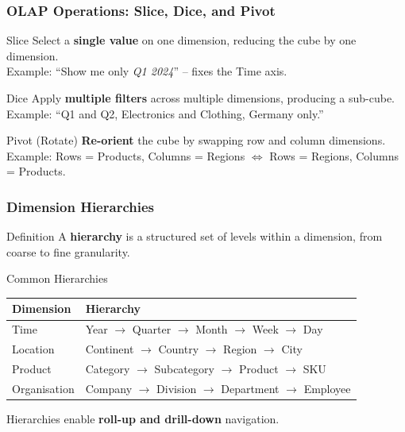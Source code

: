 \begin{frame}
  \frametitle{OLAP Operations: Slice, Dice, and Pivot}

  \begin{block}{Slice}
    Select a \textbf{single value} on one dimension, reducing the cube by one dimension.\\
    Example: ``Show me only \textit{Q1 2024}'' -- fixes the Time axis.
  \end{block}

  \begin{block}{Dice}
    Apply \textbf{multiple filters} across multiple dimensions, producing a sub-cube.\\
    Example: ``Q1 and Q2, Electronics and Clothing, Germany only.''
  \end{block}

  \begin{block}{Pivot (Rotate)}
    \textbf{Re-orient} the cube by swapping row and column dimensions.\\
    Example: Rows = Products, Columns = Regions $\Leftrightarrow$ Rows = Regions, Columns = Products.
  \end{block}

\end{frame}

\begin{frame}
  \frametitle{Dimension Hierarchies}

  \begin{block}{Definition}
    A \textbf{hierarchy} is a structured set of levels within a dimension,
    from coarse to fine granularity.
  \end{block}

  \begin{block}{Common Hierarchies}
    \begin{tabularx}{\linewidth}{@{}l X@{}}
      \toprule
      \textbf{Dimension} & \textbf{Hierarchy} \\
      \midrule
      Time    & Year $\to$ Quarter $\to$ Month $\to$ Week $\to$ Day \\
      Location & Continent $\to$ Country $\to$ Region $\to$ City \\
      Product & Category $\to$ Subcategory $\to$ Product $\to$ SKU \\
      Organisation & Company $\to$ Division $\to$ Department $\to$ Employee \\
      \bottomrule
    \end{tabularx}
  \end{block}

  Hierarchies enable \textbf{roll-up and drill-down} navigation.

\end{frame}

